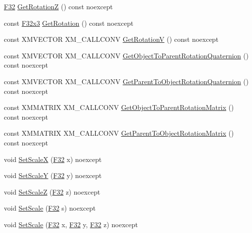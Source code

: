 \begin{DoxyCompactItemize}
\hyperlink{namespacemage_aa97e833b45f06d60a0a9c4fc22ae02c0}{F32} \hyperlink{classmage_1_1_local_transform_ae56bae1d47047892c6588a1fe3f115ad}{Get\+RotationZ} () const noexcept
\item 
const \hyperlink{namespacemage_a73fbe0da4b8d5bc156bb8453e5b63a17}{F32x3} \hyperlink{classmage_1_1_local_transform_a06ddc0ea860a58ed7d47abc115ea70e3}{Get\+Rotation} () const noexcept
\item 
const X\+M\+V\+E\+C\+T\+OR X\+M\+\_\+\+C\+A\+L\+L\+C\+O\+NV \hyperlink{classmage_1_1_local_transform_a489f350ed2e1e7eea1d168502cd03e88}{Get\+RotationV} () const noexcept
\item 
const X\+M\+V\+E\+C\+T\+OR X\+M\+\_\+\+C\+A\+L\+L\+C\+O\+NV \hyperlink{classmage_1_1_local_transform_a5d9cb07de3b11b31665f2bb35580febc}{Get\+Object\+To\+Parent\+Rotation\+Quaternion} () const noexcept
\item 
const X\+M\+V\+E\+C\+T\+OR X\+M\+\_\+\+C\+A\+L\+L\+C\+O\+NV \hyperlink{classmage_1_1_local_transform_a66e6d3320e87461203f91599e23ee6c1}{Get\+Parent\+To\+Object\+Rotation\+Quaternion} () const noexcept
\item 
const X\+M\+M\+A\+T\+R\+IX X\+M\+\_\+\+C\+A\+L\+L\+C\+O\+NV \hyperlink{classmage_1_1_local_transform_a43be02da78f59f2e6ab5d5719816498b}{Get\+Object\+To\+Parent\+Rotation\+Matrix} () const noexcept
\item 
const X\+M\+M\+A\+T\+R\+IX X\+M\+\_\+\+C\+A\+L\+L\+C\+O\+NV \hyperlink{classmage_1_1_local_transform_a5054e57409d6852adcde6283ca8a5c49}{Get\+Parent\+To\+Object\+Rotation\+Matrix} () const noexcept
\item 
void \hyperlink{classmage_1_1_local_transform_afaab2f329bb986de112e76ba8407b84e}{Set\+ScaleX} (\hyperlink{namespacemage_aa97e833b45f06d60a0a9c4fc22ae02c0}{F32} x) noexcept
\item 
void \hyperlink{classmage_1_1_local_transform_a17297480169c047f0a08c2022b69fc42}{Set\+ScaleY} (\hyperlink{namespacemage_aa97e833b45f06d60a0a9c4fc22ae02c0}{F32} y) noexcept
\item 
void \hyperlink{classmage_1_1_local_transform_a076673ed934cc2b92febfd5477e81e75}{Set\+ScaleZ} (\hyperlink{namespacemage_aa97e833b45f06d60a0a9c4fc22ae02c0}{F32} z) noexcept
\item 
void \hyperlink{classmage_1_1_local_transform_ae5940b8381188b25b164322d0c848fb3}{Set\+Scale} (\hyperlink{namespacemage_aa97e833b45f06d60a0a9c4fc22ae02c0}{F32} s) noexcept
\item 
void \hyperlink{classmage_1_1_local_transform_a81b531b924652a52a49a5163ee5f6685}{Set\+Scale} (\hyperlink{namespacemage_aa97e833b45f06d60a0a9c4fc22ae02c0}{F32} x, \hyperlink{namespacemage_aa97e833b45f06d60a0a9c4fc22ae02c0}{F32} y, \hyperlink{namespacemage_aa97e833b45f06d60a0a9c4fc22ae02c0}{F32} z) noexcept

\end{DoxyCompactItemize}
